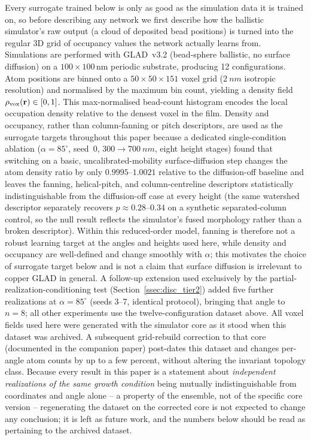 \documentclass[aip,amsmath,amssymb,reprint]{revtex4-1}
\renewcommand{\ang}{\ensuremath{\alpha}} %
\begin{document}
Every surrogate trained below is only as good as the simulation
data it is trained on, so before describing any network we first
describe how the ballistic simulator's raw output (a cloud of
deposited bead positions) is turned into the regular 3D grid of
occupancy values the network actually learns from.
Simulations are performed with GLAD~v3.2 (bead-sphere ballistic,
no surface diffusion) on a $100 \times 100\,\mathrm{nm}$ periodic
substrate, producing 12 configurations.
Atom positions are binned onto a
$50 \times 50 \times 151$ voxel grid ($\SI{2}{nm}$ isotropic
resolution) and normalised by the maximum bin count,
yielding a density field $\rho_{\rm vox}(\mathbf{r}) \in [0,1]$.
This max-normalised bead-count histogram encodes the local
occupation density relative to the densest voxel in the film.
Density and occupancy, rather than column-fanning or pitch descriptors,
are used as the surrogate targets throughout this paper because a
dedicated single-condition ablation ($\alpha=85^{\circ}$, seed~0,
$300\to\SI{700}{nm}$, eight height stages) found that switching on a
basic, uncalibrated-mobility surface-diffusion step changes the atom
density ratio by only $0.9995$--$1.0021$ relative to the diffusion-off
baseline and leaves the fanning, helical-pitch, and column-centreline
descriptors statistically indistinguishable from the diffusion-off case
at every height (the same watershed descriptor separately recovers
$p\approx0.28$--$0.34$ on a synthetic separated-column control, so the
null result reflects the simulator's fused morphology rather than a
broken descriptor). Within this reduced-order model, fanning is
therefore not a robust learning target at the angles and heights used
here, while density and occupancy are well-defined and change smoothly
with $\ang$; this motivates the choice of surrogate target below and
is not a claim that surface diffusion is irrelevant to copper GLAD in
general.
A follow-up extension used exclusively by the partial-realization-conditioning test
(Section~\ref{ssec:disc_tier2}) added five further realizations at $\ang=85^{\circ}$
(seeds 3--7, identical protocol), bringing that angle to $n=8$; all other experiments
use the twelve-configuration dataset above.
All voxel fields used here were generated with the simulator core as it stood when this
dataset was archived. A subsequent grid-rebuild correction to that core (documented in
the companion paper) post-dates this dataset and changes per-angle atom counts by up to a
few percent, without altering the invariant topology class. Because every result in this
paper is a statement about \emph{independent realizations of the same growth condition}
being mutually indistinguishable from coordinates and angle alone -- a property of the
ensemble, not of the specific core version -- regenerating the dataset on the corrected
core is not expected to change any conclusion; it is left as future work, and the numbers
below should be read as pertaining to the archived dataset.
\end{document}
